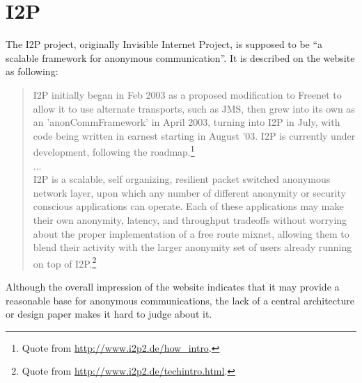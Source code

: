 \section{I2P}
The I2P project, originally Invisible Internet Project, is supposed to be
"`a scalable framework for anonymous communication"'.\cite{i2p} 
It is described on the website as following:
\begin{quote}
I2P initially began in Feb 2003 as a proposed modification to Freenet to allow it to use alternate transports, such as JMS, then grew into its own as an 'anonCommFramework' in April 2003, turning into I2P in July, with code being written in earnest starting in August '03. I2P is currently under development, 
following the roadmap.\footnote{Quote from \url{http://www.i2p2.de/how_intro}.}
\\
...
\\
I2P is a scalable, self organizing, resilient packet switched anonymous network layer, upon which any number of different anonymity or security conscious applications can operate. Each of these applications may make their own anonymity, latency, and throughput tradeoffs without worrying about the proper implementation of a free route mixnet, allowing them to blend their activity with the larger anonymity set of users already running on top of I2P.\footnote{Quote from \url{http://www.i2p2.de/techintro.html}.}
\end{quote}
Although the overall impression of the website indicates that it may provide a
reasonable base for anonymous communications, the lack of a central architecture or
design paper makes it hard to judge about it.
